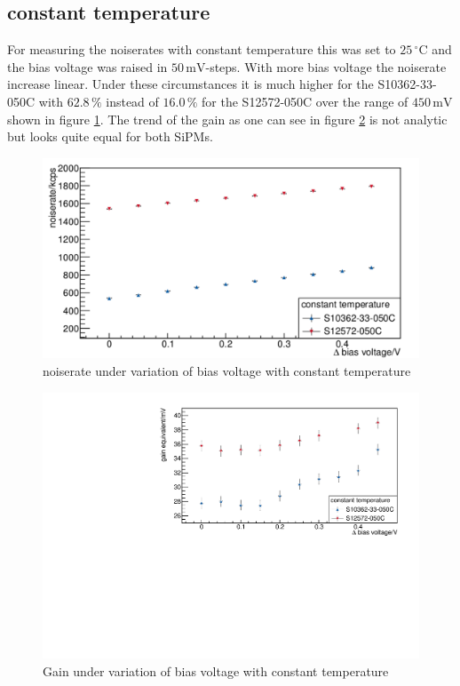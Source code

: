 \subsection{constant temperature}
For measuring the noiserates with constant temperature this was set to $25\,\mathrm{^{\circ}C}$ and the bias voltage was raised in $50\,\mathrm{mV}$-steps. With more bias voltage the noiserate increase linear. Under these circumstances it is much higher for the S10362-33-050C with $62.8\,\mathrm{\%}$ instead of $16.0\,\mathrm{\%}$ for the S12572-050C over the range of $450\,\mathrm{mV}$ shown in figure \ref{constTemp_rate}. The trend of the gain as one can see in figure \ref{constTemp_gain} is not analytic but looks quite equal for both SiPMs.
\begin{figure}[h]
	\centering
	\includegraphics[width = 0.75 \textwidth]{Figures/radermacher/ConstTemp_Rate_linear.pdf}
	\caption{noiserate under variation of bias voltage with constant temperature}
	\label{constTemp_rate}
\end{figure}
\begin{figure}[h]
	\centering
	\includegraphics[width = 0.75 \textwidth]{Figures/radermacher/constTemp_Gain.pdf}
	\caption{Gain under variation of bias voltage with constant temperature}
	\label{constTemp_gain}
\end{figure}
